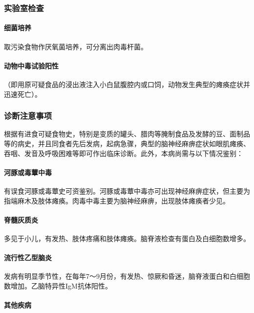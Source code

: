 \subsubsection{实验室检查}

\paragraph{细菌培养}

取污染食物作厌氧菌培养，可分离出肉毒杆菌。

\paragraph{动物中毒试验阳性}

（即用原可疑食品的浸出液注入小白鼠腹腔内或口饲，动物发生典型的瘫痪症状并迅速死亡）。

\subsubsection{诊断注意事项}

根据有进食可疑食物史，特别是变质的罐头、腊肉等腌制食品及发酵的豆、面制品等的病史，并且同食者先后发病，起病急骤，典型的脑神经麻痹症状如眼肌瘫痪、吞咽、发音及呼吸困难等即可作出临床诊断。此外，本病尚需与以下情况鉴别：

\paragraph{河豚或毒蕈中毒}

有误食河豚或毒蕈史可资鉴别。河豚或毒蕈中毒亦可出现神经麻痹症状，但主要为指端麻木及肢体瘫痪。肉毒中毒主要为脑神经麻痹，出现肢体瘫痪者少见。

\paragraph{脊髓灰质炎}

多见于小儿，有发热、肢体疼痛和肢体瘫痪。脑脊液检查有蛋白及白细胞数增多。

\paragraph{流行性乙型脑炎}

发病有明显季节性，在每年7～9月份，有发热、惊厥和昏迷，脑脊液蛋白和白细胞数增加。乙脑特异性IgM抗体阳性。

\paragraph{其他疾病}

